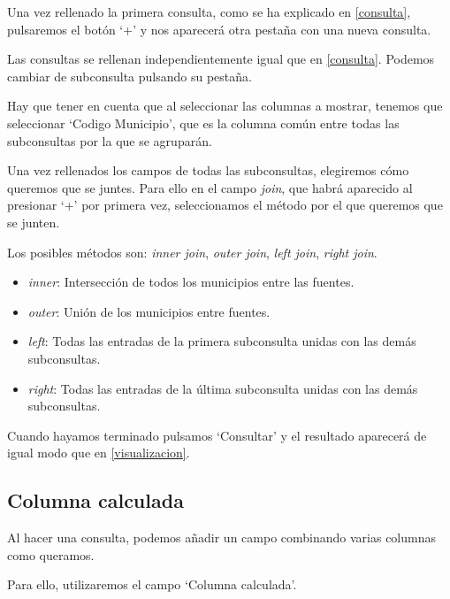 Una vez rellenado la primera consulta, como se ha explicado en \ref{consulta}, pulsaremos el botón `+' y nos aparecerá otra pestaña con una nueva consulta.



Las consultas se rellenan independientemente igual que en \ref{consulta}. Podemos cambiar de subconsulta pulsando su pestaña.

Hay que tener en cuenta que al seleccionar las columnas a mostrar, tenemos que seleccionar `Codigo Municipio', que es la columna común entre todas las subconsultas por la que se agruparán.

Una vez rellenados los campos de todas las subconsultas, elegiremos cómo queremos que se juntes. Para ello en el campo \textit{join}, que habrá aparecido al presionar `+' por primera vez, seleccionamos el método por el que queremos que se junten.

Los posibles métodos son: \textit{inner join}, \textit{outer join}, \textit{left join}, \textit{right join}.

\begin{itemize}
	\item \textit{inner}: Intersección de todos los municipios entre las fuentes.
	\item \textit{outer}: Unión de los municipios entre fuentes.
	\item \textit{left}: Todas las entradas de la primera subconsulta unidas con las demás subconsultas.
	\item \textit{right}: Todas las entradas de la última subconsulta unidas con las demás subconsultas.
\end{itemize}


Cuando hayamos terminado pulsamos `Consultar' y el resultado aparecerá de igual modo que en \ref{visualizacion}.

\subsection{Columna calculada} \label{calculada}

Al hacer una consulta, podemos añadir un campo combinando varias columnas como queramos.

Para ello, utilizaremos el campo `Columna calculada'.


